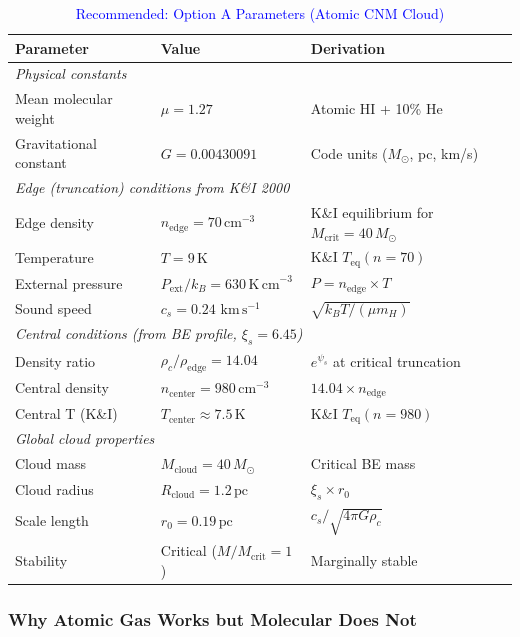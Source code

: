 \documentclass[11pt,a4paper]{article}
\newcommand{\Msun}{M_\odot}
\newcommand{\kms}{\,\mathrm{km\,s^{-1}}}
\begin{document}
\begin{table}[h]
\centering
\caption{\textcolor{blue}{Recommended: Option A Parameters (Atomic CNM Cloud)}}
\begin{tabular}{lll}
\toprule
\textbf{Parameter} & \textbf{Value} & \textbf{Derivation} \\
\midrule
\multicolumn{3}{l}{\textit{Physical constants}} \\
Mean molecular weight & $\mu = 1.27$ & Atomic HI + 10\% He \\
Gravitational constant & $G = 0.00430091$ & Code units ($\Msun$, pc, km/s) \\
\midrule
\multicolumn{3}{l}{\textit{Edge (truncation) conditions from K\&I 2000}} \\
Edge density & $n_\mathrm{edge} = 70\,\mathrm{cm}^{-3}$ & K\&I equilibrium for $M_\mathrm{crit} = 40\,\Msun$ \\
Temperature & $T = 9\,\mathrm{K}$ & K\&I $T_\mathrm{eq}(n = 70)$ \\
External pressure & $P_\mathrm{ext}/k_B = 630\,\mathrm{K\,cm}^{-3}$ & $P = n_\mathrm{edge} \times T$ \\
Sound speed & $c_s = 0.24\,\kms$ & $\sqrt{k_B T / (\mu m_H)}$ \\
\midrule
\multicolumn{3}{l}{\textit{Central conditions (from BE profile, $\xi_s = 6.45$)}} \\
Density ratio & $\rho_c / \rho_\mathrm{edge} = 14.04$ & $e^{\psi_s}$ at critical truncation \\
Central density & $n_\mathrm{center} = 980\,\mathrm{cm}^{-3}$ & $14.04 \times n_\mathrm{edge}$ \\
Central T (K\&I) & $T_\mathrm{center} \approx 7.5\,\mathrm{K}$ & K\&I $T_\mathrm{eq}(n = 980)$ \\
\midrule
\multicolumn{3}{l}{\textit{Global cloud properties}} \\
Cloud mass & $M_\mathrm{cloud} = 40\,\Msun$ & Critical BE mass \\
Cloud radius & $R_\mathrm{cloud} = 1.2\,\mathrm{pc}$ & $\xi_s \times r_0$ \\
Scale length & $r_0 = 0.19\,\mathrm{pc}$ & $c_s / \sqrt{4\pi G \rho_c}$ \\
Stability & Critical ($M/M_\mathrm{crit} = 1$) & Marginally stable \\
\bottomrule
\end{tabular}
\end{table}

\subsubsection{Why Atomic Gas Works but Molecular Does Not}
\end{document}
